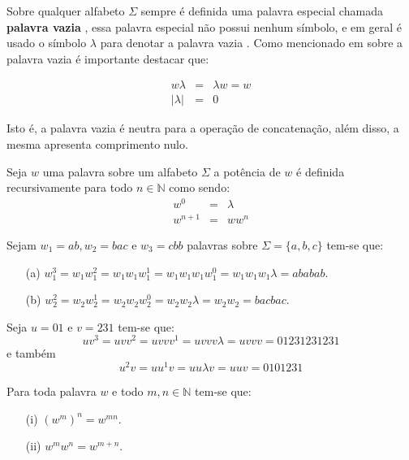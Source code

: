 Sobre qualquer alfabeto $\Sigma$ sempre é definida uma palavra especial chamada \textbf{palavra vazia} \cite{hopcroft2008, linz2006}, essa palavra especial não possui nenhum símbolo, e em geral é usado o símbolo $\lambda$ para denotar a palavra vazia \cite{benjaLivro2010, valdi2016master}. Como mencionado em \cite{benjaLivro2010, valdi2020phd} sobre a palavra vazia é importante destacar que:

\begin{eqnarray}
	w\lambda & = & \lambda w = w\\
	|\lambda| & = &  0
\end{eqnarray}

Isto é, a palavra vazia é neutra para a operação de concatenação, além disso, a mesma apresenta comprimento nulo.

\begin{definicao}\label{def:PotenciaPalavras}
	Seja $w$ uma palavra sobre um alfabeto $\Sigma$ a potência de $w$ é definida recursivamente para todo $n \in \mathbb{N}$ como sendo:
	\begin{eqnarray}
		w^0 & = & \lambda\\
		w^{n+1} & = & ww^{n}
	\end{eqnarray}
\end{definicao}

\begin{exemplo}
	Sejam $w_1 = ab, w_2 = bac$ e $w_3 = cbb$ palavras sobre $\Sigma = \{a, b, c\}$ tem-se que:
	\begin{itemize}
		\item[(a)] $w_1^3 = w_1w_1^2 = w_1w_1w_1^1 = w_1w_1w_1w_1^0 = w_1w_1w_1\lambda = ababab$.
		\item[(b)] $w_2^2 = w_2w_2^1 = w_2w_2w_2^0 = w_2w_2\lambda = w_2w_2 = bacbac$.
	\end{itemize} 
\end{exemplo}

\begin{exemplo}
	Seja $u = 01$ e $v = 231$ tem-se que: 
	$$uv^3 = uvv^2 = uvvv^1 = uvvv\lambda = uvvv = 01231231231$$
	e também 
	$$u^2v = uu^1v = uu\lambda v = uuv = 0101231$$
\end{exemplo}

\begin{proposicao}
  Para toda palavra $w$ e todo $m,n \in \mathbb{N}$ tem-se que:
	\begin{itemize}
		\item[(i)] $(w^m)^n = w^{mn}$.
		\item[(ii)] $w^mw^n = w^{m+n}$.
	\end{itemize}  
\end{proposicao}

